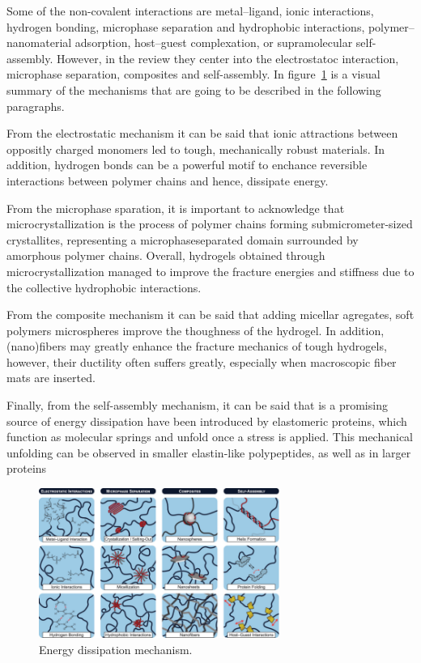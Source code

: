 Some of the non-covalent interactions are 
    metal–ligand, 
    ionic interactions, 
    hydrogen bonding, 
    microphase separation 
    and hydrophobic interactions, 
    polymer–nanomaterial adsorption, 
    host–guest complexation, 
    or supramolecular self-assembly.
However, in the review they center into the electrostatoc interaction, microphase separation, composites and self-assembly.
In figure~\ref{fig:energyDissipation} is a visual summary of the mechanisms that are going to be described in the following paragraphs.

From the electrostatic mechanism it can be said that ionic attractions between oppositly charged monomers led to tough, mechanically robust materials.
In addition, hydrogen bonds can be a powerful motif to enchance reversible interactions between polymer chains and hence, dissipate energy.

From the microphase sparation, it is important to acknowledge that microcrystallization is the process of polymer chains forming submicrometer-sized crystallites, representing a microphaseseparated domain surrounded by amorphous polymer chains.
Overall, hydrogels obtained through microcrystallization managed to improve the fracture energies and stiffness due to the collective hydrophobic interactions. 

From the composite mechanism it can be said that adding micellar agregates, soft polymers microspheres improve the thoughness of the hydrogel.
In addition, (nano)fibers may greatly enhance the fracture mechanics of tough hydrogels, however, their ductility often suffers greatly, especially when macroscopic fiber mats are inserted.

Finally, from the self-assembly mechanism, it can be said that is a promising source of energy dissipation have been introduced by elastomeric proteins, which function as molecular springs and unfold once a stress is applied. 
This mechanical unfolding can be observed in smaller elastin-like polypeptides, as well as in larger proteins

\begin{figure}[ht!]
    \centering
    \includegraphics[width=0.7\textwidth]{figs/explainMechResponse/energyDissipationMechanisms.png
}
    \caption{Energy dissipation mechanism\citep{naritaViscoelasticPropertiesPolyvinyl2013}.}\label{fig:energyDissipation}
\end{figure}


